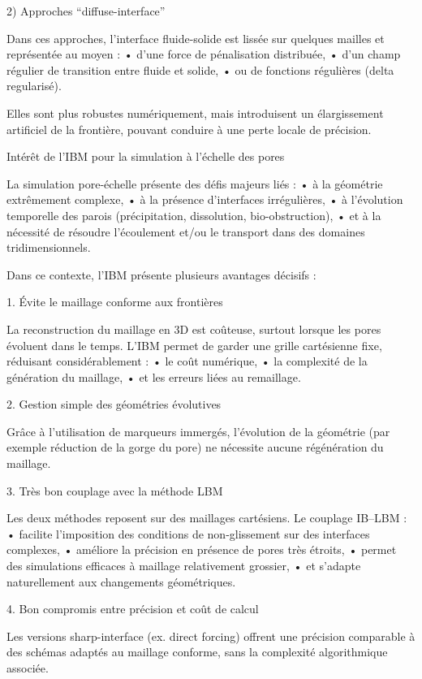 \documentclass[12pt,a4paper]{report}
\begin{document}
2) Approches “diffuse-interface”

Dans ces approches, l’interface fluide-solide est lissée sur quelques mailles et représentée au moyen :
	•	d’une force de pénalisation distribuée,
	•	d’un champ régulier de transition entre fluide et solide,
	•	ou de fonctions régulières (delta regularisé).

Elles sont plus robustes numériquement, mais introduisent un élargissement artificiel de la frontière, pouvant conduire à une perte locale de précision.


Intérêt de l’IBM pour la simulation à l’échelle des pores

La simulation pore-échelle présente des défis majeurs liés :
	•	à la géométrie extrêmement complexe,
	•	à la présence d’interfaces irrégulières,
	•	à l’évolution temporelle des parois (précipitation, dissolution, bio-obstruction),
	•	et à la nécessité de résoudre l’écoulement et/ou le transport dans des domaines tridimensionnels.

Dans ce contexte, l’IBM présente plusieurs avantages décisifs :

 1. Évite le maillage conforme aux frontières

La reconstruction du maillage en 3D est coûteuse, surtout lorsque les pores évoluent dans le temps.
L’IBM permet de garder une grille cartésienne fixe, réduisant considérablement :
	•	le coût numérique,
	•	la complexité de la génération du maillage,
	•	et les erreurs liées au remaillage.

 2. Gestion simple des géométries évolutives

Grâce à l’utilisation de marqueurs immergés, l’évolution de la géométrie (par exemple réduction de la gorge du pore) ne nécessite aucune régénération du maillage.

 3. Très bon couplage avec la méthode LBM

Les deux méthodes reposent sur des maillages cartésiens.
Le couplage IB–LBM :
	•	facilite l’imposition des conditions de non-glissement sur des interfaces complexes,
	•	améliore la précision en présence de pores très étroits,
	•	permet des simulations efficaces à maillage relativement grossier,
	•	et s’adapte naturellement aux changements géométriques.

 4. Bon compromis entre précision et coût de calcul

Les versions sharp-interface (ex. direct forcing) offrent une précision comparable à des schémas adaptés au maillage conforme, sans la complexité algorithmique associée.
\end{document}
